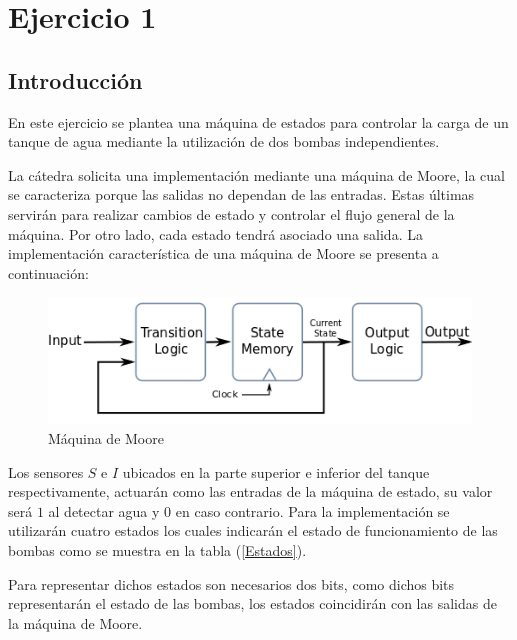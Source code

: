 \section{Ejercicio 1}

\subsection{Introducción}

En este ejercicio se plantea una máquina de estados para controlar la carga de un tanque de agua mediante la utilización de dos bombas independientes. \par
La cátedra solicita una implementación mediante una máquina de Moore, la cual se caracteriza porque las salidas no dependan de las entradas. Estas últimas servirán para realizar cambios de estado y controlar el flujo general de la máquina. Por otro lado, cada estado tendrá asociado una salida. La implementación característica de una máquina de Moore se presenta a continuación:

\begin{figure}[H]
\begin{center}
\includegraphics[scale=0.8]{Ejercicio1/Imagenes/moore}
\caption{Máquina de Moore}
\end{center}
\label{Maquina_de_Moore}
\end{figure}

Los sensores $S$ e $I$ ubicados en la parte superior e inferior del tanque respectivamente, actuarán como las entradas de la máquina de estado, su valor será $1$ al detectar agua y $0$ en caso contrario. Para la implementación se utilizarán cuatro estados los cuales indicarán el estado de funcionamiento de las bombas como se muestra en la tabla (\ref{Estados}). \par
Para representar dichos estados son necesarios dos bits, como dichos bits representarán el estado de las bombas, los estados coincidirán con las salidas de la máquina de Moore.
 

\begin{table}[H]
	\begin{center}
	\caption{Estados utilizados}
	\end{center}
	\label{Estados}
\end{table}



